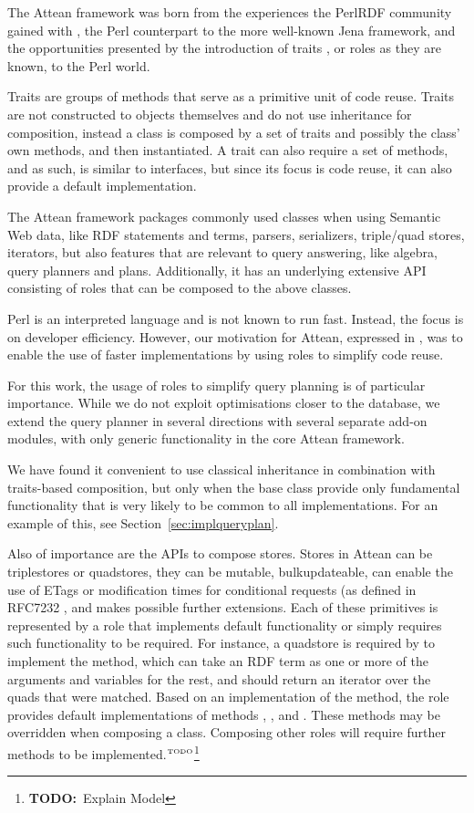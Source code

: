 \documentclass[a4paper, 12pt]{article}
\newcommand{\todo}[1]{\ensuremath{^{\textrm{\tiny{TODO}\normalsize}}}\footnote{\textbf{TODO:}~#1}}
\begin{document}
The Attean framework was born from the experiences the PerlRDF
community gained with , the Perl counterpart to
the more well-known Jena framework, and the opportunities presented by
the introduction of traits \cite{traits}, or roles as they are known,
to the Perl world.

Traits are groups of methods that serve as a primitive unit of code
reuse. Traits are not constructed to objects themselves and do not
use inheritance for composition, instead a class is composed by a set of
traits and possibly the class' own methods, and then instantiated. A
trait can also require a set of methods, and as such, is similar to
interfaces, but since its focus is code reuse, it can also provide a
default implementation. 

The Attean framework packages commonly used classes when using
Semantic Web data, like RDF statements and terms, parsers,
serializers, triple/quad stores, iterators, but also features that are
relevant to query answering, like algebra, query planners and
plans. Additionally, it has an underlying extensive API consisting of
roles that can be composed to the above classes.

Perl is an interpreted language and is not known to run fast. Instead,
the focus is on developer efficiency. However, our motivation for
Attean, expressed in \cite{williamspushing}, was to enable the use
of faster implementations by using roles to simplify code reuse.

For this work, the usage of roles to simplify query planning is of
particular importance. While we do not exploit optimisations closer to
the database, we extend the query planner in several directions with
several separate add-on modules, with only generic functionality in
the core Attean framework.

We have found it convenient to use classical inheritance in
combination with traits-based composition, but only when the base
class provide only fundamental functionality that is very likely to be
common to all implementations. For an example of this, see
Section~\ref{sec:implqueryplan}.

Also of importance are the APIs to compose stores. Stores in Attean
can be triplestores or quadstores, they can be mutable,
bulkupdateable, can enable the use of ETags or modification times for
conditional requests (as defined in RFC7232 \cite{rfc7234}, and makes
possible further extensions. Each of these primitives is represented
by a role that implements default functionality or simply requires
such functionality to be required. For instance, a quadstore is
required by  to implement the
 method, which can take an RDF term as one or more
of the arguments and variables for the rest, and should return an
iterator over the quads that were matched. Based on an implementation
of the  method, the 
role provides default implementations of methods ,
,  and
. These methods may be overridden when composing a
class. Composing other roles will require further methods to be
implemented.\todo{Explain Model}
\end{document}
